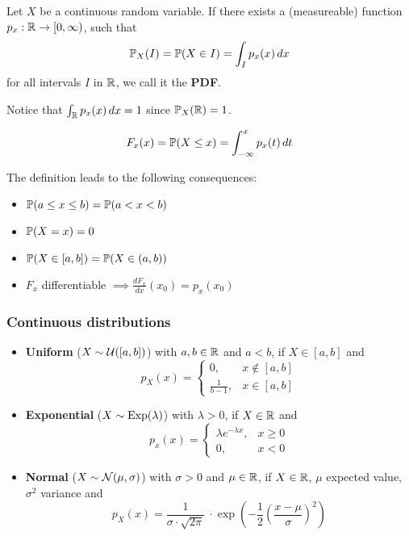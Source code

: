 \begin{cdefinition*}
  Let \(X\) be a continuous random variable. If there exists a (measureable) function \(p_x: \R \to [0, \infty)\), such that
  \[\P_X(I) = \P(X \in I) = \int_I p_x(x) \,dx\]
  for all intervals \(I\) in \(\R\), we call it the \textbf{PDF}.
\end{cdefinition*}

Notice that \(\int_\R p_x(x) \, dx = 1\) since \(\P_X(\R) = 1\).

\begin{cdefinition*}
  \[F_x(x) = \P(X \leq x) = \int_{-\infty}^x p_x(t) \,dt\]
\end{cdefinition*}
The definition leads to the following consequences:
\begin{itemize}
  \item \(\P(a \leq x \leq b) = \P(a < x < b)\)
  \item \(\P(X = x) = 0\)
  \item \(\P(X \in [a, b]) = \P(X \in (a, b))\)
  \item \(F_x\) differentiable \(\implies \frac{dF_x}{dx}(x_0) = p_x(x_0)\)
\end{itemize}

\subsubsection{Continuous distributions}
\begin{itemize}
  \item \textbf{Uniform} (\(X \sim \Unif([a, b])\)) with \(a, b \in \R\) and \(a < b\), if \(X \in [a, b]\) and
  \[p_X(x) = \begin{cases}
    0, & x \notin [a, b] \\
    \frac{1}{b - 1}, & x \in [a, b]
  \end{cases}\]

  \item \textbf{Exponential} (\(X \sim \Exp(\lambda)\)) with \(\lambda > 0\), if \(X \in \R\) and
  \[p_x(x) = \begin{cases}
    \lambda e^{-\lambda x}, & x \geq 0 \\
    0, & x < 0
  \end{cases}\]

  \item \textbf{Normal} (\(X \sim \Normal(\mu, \sigma)\)) with \(\sigma > 0\) and \(\mu \in \R\), if \(X \in \R\), \(\mu\) expected value, \(\sigma^2\) variance and
  \[p_X(x) = \frac{1}{\sigma \cdot \sqrt{2 \pi}}\ \cdot \exp(-\frac{1}{2}\left(\frac{x - \mu}{\sigma}\right)^2)\]
\end{itemize}
